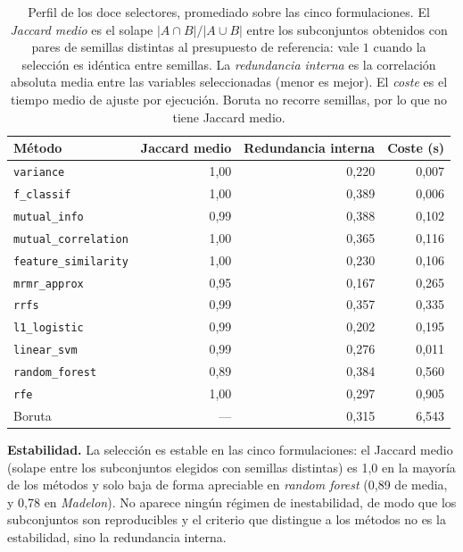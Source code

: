 \begin{table}[!htbp]
  \centering
  \caption[Perfil de los doce selectores]{Perfil de los doce selectores,
    promediado sobre las cinco formulaciones. El \emph{Jaccard medio} es
    el solape $|A\cap B|/|A\cup B|$ entre los subconjuntos obtenidos con
    pares de semillas distintas al presupuesto de referencia: vale $1$
    cuando la selección es idéntica entre semillas. La \emph{redundancia
    interna} es la correlación absoluta media entre las variables
    seleccionadas (menor es mejor). El \emph{coste} es el tiempo medio de
    ajuste por ejecución. Boruta no recorre semillas, por lo que no tiene
    Jaccard medio.}
  \label{tab:perfil}
  \small
  \begin{tabular}{lrrr}
    \toprule
    Método & Jaccard medio & Redundancia interna & Coste (s) \\
    \midrule
    \texttt{variance}            & 1{,}00 & 0{,}220 & 0{,}007 \\
    \texttt{f\_classif}          & 1{,}00 & 0{,}389 & 0{,}006 \\
    \texttt{mutual\_info}        & 0{,}99 & 0{,}388 & 0{,}102 \\
    \texttt{mutual\_correlation} & 1{,}00 & 0{,}365 & 0{,}116 \\
    \texttt{feature\_similarity} & 1{,}00 & 0{,}230 & 0{,}106 \\
    \texttt{mrmr\_approx}        & 0{,}95 & 0{,}167 & 0{,}265 \\
    \texttt{rrfs}                & 0{,}99 & 0{,}357 & 0{,}335 \\
    \texttt{l1\_logistic}        & 0{,}99 & 0{,}202 & 0{,}195 \\
    \texttt{linear\_svm}         & 0{,}99 & 0{,}276 & 0{,}011 \\
    \texttt{random\_forest}      & 0{,}89 & 0{,}384 & 0{,}560 \\
    \texttt{rfe}                 & 1{,}00 & 0{,}297 & 0{,}905 \\
    Boruta                       & ---  & 0{,}315 & 6{,}543 \\
    \bottomrule
  \end{tabular}
\end{table}
\FloatBarrier

\textbf{Estabilidad.} La selección es estable en las cinco
formulaciones: el Jaccard medio (solape entre los subconjuntos elegidos
con semillas distintas) es 1{,}0 en la mayoría de los métodos y solo baja
de forma apreciable en \textit{random forest} (0{,}89 de media, y 0{,}78 en
\textit{Madelon}). No aparece ningún régimen de inestabilidad, de modo
que los subconjuntos son reproducibles y el criterio que distingue a los
métodos no es la estabilidad, sino la redundancia interna.

